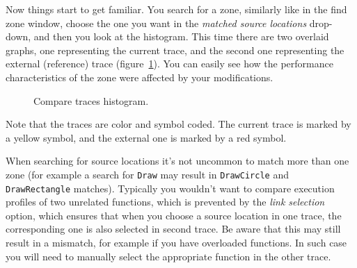 \documentclass[hidelinks,titlepage,a4paper]{article}
\begin{document}
Now things start to get familiar. You search for a zone, similarly like in the find zone window, choose the one you want in the \emph{matched source locations} drop-down, and then you look at the histogram. This time there are two overlaid graphs, one representing the current trace, and the second one representing the external (reference) trace (figure~\ref{comparehistogram}). You can easily see how the performance characteristics of the zone were affected by your modifications.

\begin{figure}[h]
\centering{}
\caption{Compare traces histogram.}
\label{comparehistogram}
\end{figure}

Note that the traces are color and symbol coded. The current trace is marked by a yellow \faLemon{} symbol, and the external one is marked by a red \faGem{} symbol.

When searching for source locations it's not uncommon to match more than one zone (for example a search for \texttt{Draw} may result in \texttt{DrawCircle} and \texttt{DrawRectangle} matches). Typically you wouldn't want to compare execution profiles of two unrelated functions, which is prevented by the \emph{link selection} option, which ensures that when you choose a source location in one trace, the corresponding one is also selected in second trace. Be aware that this may still result in a mismatch, for example if you have overloaded functions. In such case you will need to manually select the appropriate function in the other trace.
\end{document}
